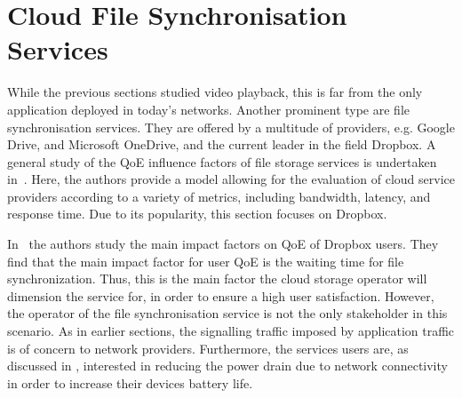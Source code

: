 \section{Cloud File Synchronisation Services}\label{sec:application:cloud_file_synchronisation}

\newcommand{\dropbox}{\emph{DropBox}\xspace}
\newcommand{\imageFileSize}{\ensuremath{S_I}\xspace}
\newcommand{\imageArrivalRate}{\ensuremath{\lambda_I}\xspace}
\newcommand{\panTransferRate}{\ensuremath{B_{P}}\xspace}
\newcommand{\interarrivaltime}{\ensuremath{t_I}\xspace}
\newcommand{\clientpreparationtime}{\ensuremath{C}\xspace}
\newcommand{\uploadbandwidth}{\ensuremath{B_U}\xspace}
\newcommand{\idleThreshold}{\ensuremath{\tau}\xspace}
\newcommand{\serverpreparationtime}{\ensuremath{S}\xspace}
\newcommand{\downloadbandwidth}{\ensuremath{B_D}\xspace}
\newcommand{\startupDelay}{\ensuremath{\sigma}\xspace}
\newcommand{\sojournTime}{\ensuremath{\Sigma}\xspace}
\newcommand{\relativeDisconnectedTime}{\ensuremath{\Delta}\xspace}
\newcommand{\connectionCount}{\ensuremath{K}\xspace}
\newcommand{\algointerval}{\emph{Interval}\xspace}
\newcommand{\algosize}{\emph{Size}\xspace}
\newcommand{\algoimmediate}{\emph{Immediate}\xspace}
\newcommand{\numberOfFiles}{\ensuremath{n}}

While the previous sections studied video playback, this is far from the only application deployed in today's networks.
Another prominent type are file synchronisation services.
They are offered by a multitude of providers, e.g. Google Drive, and Microsoft OneDrive, and the current leader in the field Dropbox.
A general study of the \gls{QoE} influence factors of file storage services is undertaken in~\cite{Qian2011b}.
Here, the authors provide a model allowing for the evaluation of cloud service providers according to a variety of metrics, including bandwidth, latency, and response time.
Due to its popularity, this section focuses on Dropbox.

In~\cite{Amrehm2013} the authors study the main impact factors on \gls{QoE} of Dropbox users.
They find that the main impact factor for user \gls{QoE} is the waiting time for file synchronization.
Thus, this is the main factor the cloud storage operator will dimension the service for, in order to ensure a high user satisfaction. 
However, the operator of the file synchronisation service is not the only stakeholder in this scenario.
As in earlier sections, the signalling traffic imposed by application traffic is of concern to network providers.
Furthermore, the services users are, as discussed in , interested in reducing the power drain due to network connectivity in order to increase their devices battery life.

